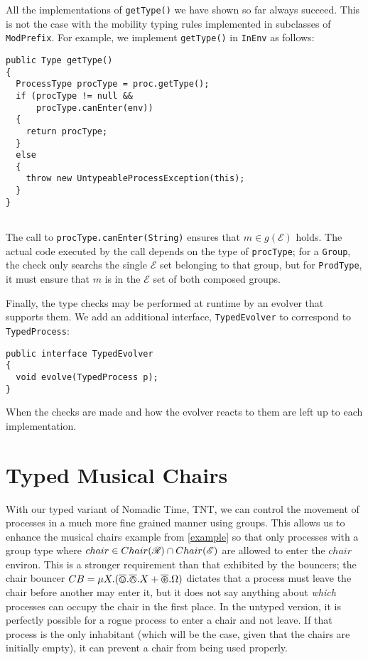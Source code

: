 All the implementations of \texttt{getType()} we have shown so far
always succeed.  This is not the case with the mobility typing rules
implemented in subclasses of \texttt{ModPrefix}.  For example, we
implement \texttt{getType()} in \texttt{InEnv} as follows:

\begin{verbatim}
public Type getType()
{
  ProcessType procType = proc.getType();  
  if (procType != null &&
      procType.canEnter(env))
  {
    return procType;
  }
  else
  {
    throw new UntypeableProcessException(this);
  }
}
 
\end{verbatim}

\noindent The call to \texttt{procType.canEnter(String)} ensures that
$m \in g(\mathscr{E})$ holds.  The actual code executed by the call
depends on the type of \texttt{procType}; for a \texttt{Group}, the
check only searchs the single $\mathcal{E}$ set belonging to that
group, but for \texttt{ProdType}, it must ensure that $m$ is in the
$\mathcal{E}$ set of both composed groups.

Finally, the type checks may be performed at runtime by an evolver
that supports them.  We add an additional interface,
\texttt{TypedEvolver} to correspond to \texttt{TypedProcess}:

\begin{verbatim}
public interface TypedEvolver
{
  void evolve(TypedProcess p);
}
\end{verbatim}

\noindent When the checks are made and how the evolver reacts to them
are left up to each implementation.

\section{Typed Musical Chairs}
\label{typedexample}

With our typed variant of Nomadic Time, TNT, we can control the
movement of processes in a much more fine grained manner using groups.
This allows us to enhance the musical chairs example from
\ref{example} so that only processes with a group type where $chair
\in Chair(\mathscr{R}) \cap Chair(\mathscr{E})$ are allowed to enter the
$chair$ environ.  This is a stronger requirement than that exhibited
by the bouncers; the chair bouncer $CB = \mu X.(\overline{\varovee} .\overline{\varowedge} .X +
\overline{\varoast} .\Omega)$ dictates that a process must leave the chair before
another may enter it, but it does not say anything about \emph{which}
processes can occupy the chair in the first place.  In the untyped
version, it is perfectly possible for a rogue process to enter a chair
and not leave.  If that process is the only inhabitant (which will be
the case, given that the chairs are initially empty), it can prevent a
chair from being used properly.


